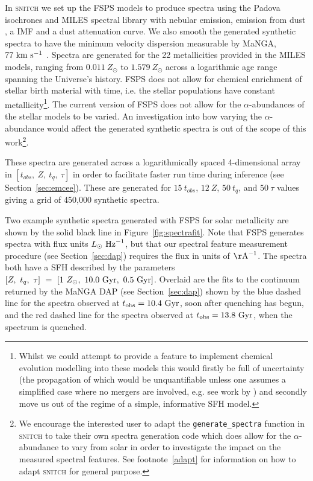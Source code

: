 \documentclass[useAMS,usenatbib]{mn2e}
\def\referee		{\color{refer}}
\begin{document}
In \textsc{snitch} we set up the FSPS models to produce spectra using the Padova isochrones \citep{girardi02} and MILES spectral library \citep{vazdekis16} with nebular emission, emission from dust \cite{draineli07}, a \cite{chabrier03} IMF and a \cite{calzetti00} dust attenuation curve. We also smooth the generated synthetic spectra to have the minimum velocity dispersion measurable by MaNGA, $77~\rm{km}~{s}^{-1}$ \citep{bundy15}. Spectra are generated for the 22 metallicities provided in the MILES models, ranging from $0.011~Z_{\odot}$ to $1.579~Z_{\odot}$ across a logarithmic age range spanning the Universe's history. FSPS does not allow for chemical enrichment of stellar birth material with time, i.e. the stellar populations have constant metallicity\footnote{Whilst we could attempt to provide a feature to implement chemical evolution modelling into these models this would firstly be full of uncertainty (the propagation of which would be unquantifiable {\referee unless one assumes a simplified case where no mergers are involved, e.g. see work by \citealt{kirby13, chill18}}) and secondly move us out of the regime of a simple, informative SFH model.}. {\referee The current version of FSPS does not allow for the $\alpha$-abundances of the stellar models to be varied. An investigation into how varying the $\alpha$-abundance would affect the generated synthetic spectra is out of the scope of this work}\footnote{{\referee We encourage the interested user to adapt the \texttt{generate\_spectra} function in \textsc{snitch} to take their own spectra generation code which does allow for the $\alpha$-abundance to vary from solar in order to investigate the impact on the measured spectral features. See footnote~\ref{adapt} for information on how to adapt \textsc{snitch} for general purpose.}}.

These spectra are generated across a logarithmically spaced 4-dimensional array in $[t_{obs},~Z,~t_q,~\tau]$ in order to facilitate faster run time during inference (see Section~\ref{sec:emcee}). These are generated for $15~t_{obs}$, $12~Z$, $50~t_q$, and $50~\tau$ values giving a grid of 450,000 synthetic spectra.

Two example synthetic spectra generated with FSPS for solar metallicity are shown by the solid black line in Figure~\ref{fig:spectrafit}. Note that FSPS generates spectra with flux units $L_{\odot}~\rm{Hz}^{-1}$, but that our spectral feature measurement procedure (see Section~\ref{sec:dap}) requires the flux in units of $\rm{\AA}^{-1}$. The spectra both have a SFH described by the parameters $[Z,~t_q,~\tau]~=~[1~Z_{\odot},~10.0~\rm{Gyr},~0.5~\rm{Gyr}]$. Overlaid are the fits to the continuum returned by the MaNGA DAP (see Section~\ref{sec:dap}) shown by the blue dashed line for the spectra observed at $t_{\rm{obs}} = 10.4~\rm{Gyr}$, soon after quenching has begun, and the red dashed line for the spectra observed at $t_{\rm{obs}} = 13.8~\rm{Gyr}$, when the spectrum is quenched.
\end{document}
